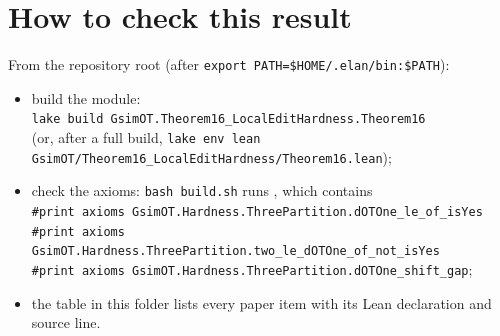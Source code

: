 \section{How to check this result}
From the repository root (after \texttt{export PATH=\$HOME/.elan/bin:\$PATH}):
\begin{itemize}
\item build the module:\\ \texttt{lake build GsimOT.Theorem16\_LocalEditHardness.Theorem16}\\
  (or, after a full build, \texttt{lake env lean GsimOT/Theorem16\_LocalEditHardness/Theorem16.lean});
\item check the axioms: \texttt{bash build.sh} runs , which contains\\
  \texttt{\#print axioms GsimOT.Hardness.ThreePartition.dOTOne\_le\_of\_isYes}\\
  \texttt{\#print axioms GsimOT.Hardness.ThreePartition.two\_le\_dOTOne\_of\_not\_isYes}\\
  \texttt{\#print axioms GsimOT.Hardness.ThreePartition.dOTOne\_shift\_gap};
\item the table  in this folder lists every paper item with its Lean
  declaration and source line.
\end{itemize}

